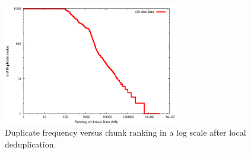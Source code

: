 
\begin{figure}
\centering
 \includegraphics[width=3in]{figures/log-log-disk}
\caption{Duplicate frequency versus  chunk ranking in a log scale after local deduplication.}
\label{fig:Datazipf}
\end{figure}



